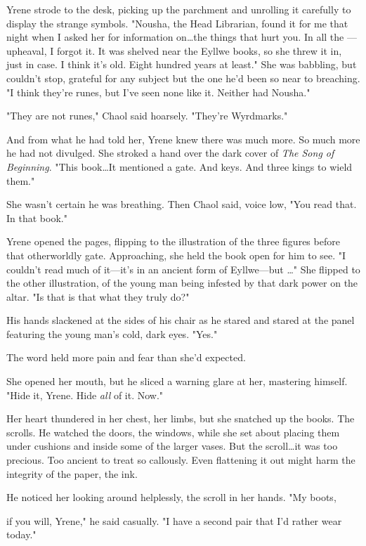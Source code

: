 Yrene strode to the desk, picking up the parchment and unrolling it carefully to display the strange symbols.
"Nousha, the Head Librarian, found it for me that night when I asked her for information on\ldots the things that hurt you.
In all the ---upheaval, I forgot it.
It was shelved near the Eyllwe books, so she threw it in, just in case.
I think it's old.
Eight hundred years at least."
She was babbling, but couldn't stop, grateful for any subject but the one he'd been so near to breaching.
"I think they're runes, but I've seen none like it.
Neither had Nousha."

"They are not runes," Chaol said hoarsely.
"They're Wyrdmarks."

And from what he had told her, Yrene knew there was much more.
So much more he had not divulged.
She stroked a hand over the dark cover of \emph{The Song of Beginning}.
"This book\ldots It mentioned a gate.
And keys.
And three kings to wield them."

She wasn't certain he was breathing.
Then Chaol said, voice low, "You read that.
In that book."

Yrene opened the pages, flipping to the illustration of the three figures before that otherworldly gate.
Approaching, she held the book open for him to see.
"I couldn't read much of it---it's in an ancient form of Eyllwe---but \ldots" She flipped to the other illustration, of the young man being infested by that dark power on the altar.
"Is that  is that what they truly do?"

His hands slackened at the sides of his chair as he stared and stared at the panel featuring the young man's cold, dark eyes.
"Yes."

The word held more pain and fear than she'd expected.

She opened her mouth, but he sliced a warning glare at her, mastering himself.
"Hide it, Yrene.
Hide \emph{all} of it.
Now."

Her heart thundered in her chest, her limbs, but she snatched up the books.
The scrolls.
He watched the doors, the windows, while she set about placing them under cushions and inside some of the larger vases.
But the scroll\ldots it was too precious.
Too ancient to treat so callously.
Even flattening it out might harm the integrity of the paper, the ink.

He noticed her looking around helplessly, the scroll in her hands.
"My boots,

if you will, Yrene," he said casually.
"I have a second pair that I'd rather wear today."

